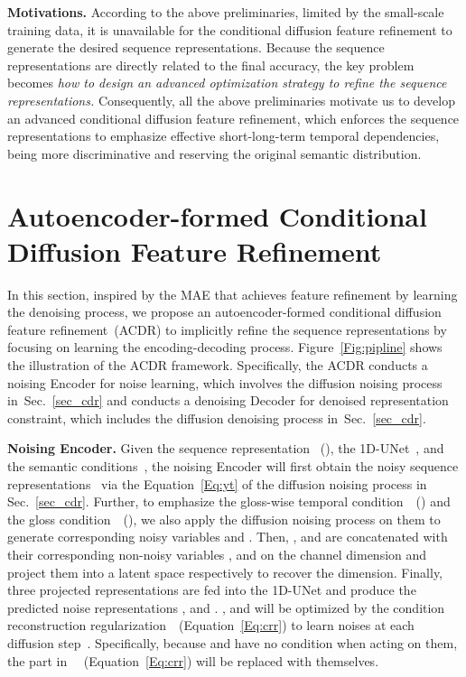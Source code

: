 \documentclass[sigconf]{acmart}
\begin{document}
\noindent \textbf{Motivations.}
According to the above preliminaries, limited by the small-scale training data, it is unavailable for the conditional diffusion feature refinement to generate the desired sequence representations.
Because the sequence representations are directly related to the final accuracy, the key problem becomes \textit{how to design an advanced optimization strategy to refine the sequence representations.}
Consequently, all the above preliminaries motivate us to develop an advanced conditional diffusion feature refinement, which enforces the sequence representations to emphasize effective short-long-term temporal dependencies, being more discriminative and reserving the original semantic distribution.  





\section{Autoencoder-formed Conditional Diffusion Feature Refinement}
\label{sec_ACDR}
In this section, inspired by the MAE that achieves feature refinement by learning the denoising process, we propose an autoencoder-formed conditional diffusion feature refinement~(ACDR) to
implicitly refine the sequence representations by 
focusing on learning the encoding-decoding process.
Figure~\ref{Fig:pipline} shows the illustration of the ACDR framework.
Specifically, the ACDR conducts a noising Encoder for noise learning, which involves the diffusion noising process in~Sec.~\ref{sec_cdr} and conducts a denoising Decoder for denoised representation constraint, which includes the diffusion denoising process in~Sec.~\ref{sec_cdr}.
  


\noindent \textbf{Noising Encoder.}
Given the sequence representation ~(), the 1D-UNet~, and the semantic conditions~, the noising Encoder will first obtain the noisy sequence representations~ via the Equation~\ref{Eq:yt} of the diffusion noising process in Sec.~\ref{sec_cdr}.
Further, to emphasize the gloss-wise temporal condition~~() and the gloss condition~~(), we also apply the diffusion noising process on them to generate corresponding noisy variables  and .
Then, ,  and  are concatenated with their corresponding non-noisy variables ,  and  on the channel dimension and project them into a latent space respectively to recover the dimension.
Finally, three projected representations are fed into the 1D-UNet and produce the predicted noise representations ,  and . 
,  and  will be optimized by the condition reconstruction regularization~~(Equation~\ref{Eq:crr}) to learn noises at each diffusion step~.
Specifically, because  and  have no condition when acting on them, the  part in ~~(Equation~\ref{Eq:crr}) will be replaced with themselves.
\end{document}
